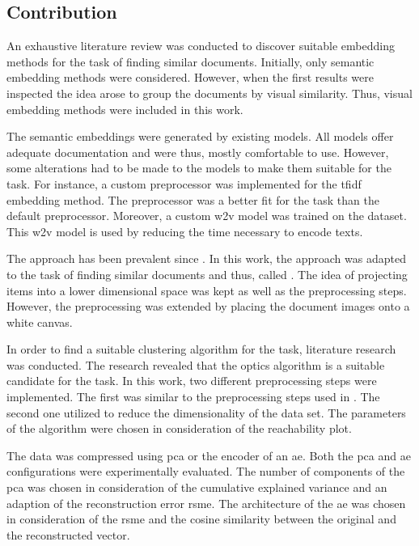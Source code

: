 \subsection{Contribution}\label{subsec:contribution}
An exhaustive literature review was conducted to discover suitable embedding methods for the task of finding similar documents.
Initially, only semantic embedding methods were considered.
However, when the first results were inspected the idea arose to group the documents by visual similarity.
Thus, visual embedding methods were included in this work.

The semantic embeddings were generated by existing models.
All models offer adequate documentation and were thus, mostly comfortable to use.
However, some alterations had to be made to the models to make them suitable for the task.
For instance, a custom preprocessor was implemented for the \ac{tfidf} embedding method.
The preprocessor was a better fit for the task than the default preprocessor.
Moreover, a custom \ac{w2v} model was trained on the dataset.
This \ac{w2v} model is used by \infersent{} reducing the time necessary to encode texts.

The \eigenfaces{} approach has been prevalent since \citeyear{eigenfaces1991}.
In this work, the approach was adapted to the task of finding similar documents and thus, called \eigendocs{}.
The idea of projecting items into a lower dimensional space was kept as well as the preprocessing steps.
However, the preprocessing was extended by placing the document images onto a white canvas.


In order to find a suitable clustering algorithm for the task, literature research was conducted.
The research revealed that the \ac{optics} algorithm is a suitable candidate for the task.
In this work, two different preprocessing steps were implemented.
The first was similar to the preprocessing steps used in \cite{OPTICS1999}.
The second one utilized \eigendocs{} to reduce the dimensionality of the data set.
The parameters of the algorithm were chosen in consideration of the reachability plot.


The data was compressed using \ac{pca} or the encoder of an \ac{ae}.
Both the \ac{pca} and \ac{ae} configurations were experimentally evaluated.
The number of components of the \ac{pca} was chosen in consideration of the cumulative explained variance 
and an adaption of the reconstruction error \ac{rsme}.
The architecture of the \ac{ae} was chosen in consideration of the \ac{rsme} and 
the cosine similarity between the original and the reconstructed vector.


